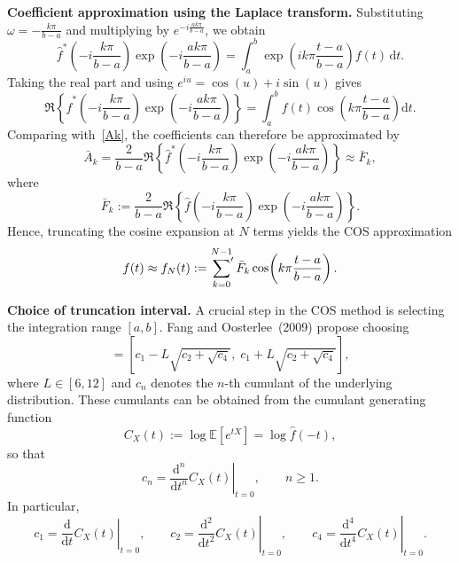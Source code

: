 \documentclass[11pt]{article}
\begin{document}
\noindent
\textbf{Coefficient approximation using the Laplace transform.}
Substituting $\omega=-\frac{k\pi}{b-a}$ and multiplying by $e^{-i\frac{ak\pi}{b-a}}$, we obtain
\begin{equation}
    \hat{f}^{*}\!\left(-i\frac{k\pi}{b-a}\right)
    \exp\!\left(-i\frac{ak\pi}{b-a}\right)
    =
    \int_{a}^{b}
    \exp\!\left(i k\pi\frac{t-a}{b-a}\right)
    f(t)\,\mathrm{d}t.
\end{equation}
Taking the real part and using $e^{iu}=\cos(u)+i\sin(u)$ gives
\begin{equation}\label{realpart}
    \Re\!\left\{
    \hat{f}^{*}\!\left(-i\frac{k\pi}{b-a}\right)
    \exp\!\left(-i\frac{ak\pi}{b-a}\right)
    \right\}
    =
    \int_{a}^{b}
    f(t)\cos\!\left(k\pi\frac{t-a}{b-a}\right)\mathrm{d}t.
\end{equation}
Comparing with~\eqref{Ak}, the coefficients can therefore be approximated by
\begin{equation}
    \bar{A}_k
    =
    \frac{2}{b-a}
    \Re\!\left\{
    \hat{f}^{*}\!\left(-i\frac{k\pi}{b-a}\right)
    \exp\!\left(-i\frac{ak\pi}{b-a}\right)
    \right\}
    \approx
    \bar{F}_k,
\end{equation}
where
\begin{equation}
    \bar{F}_k
    :=
    \frac{2}{b-a}
    \Re\!\left\{
    \hat{f}\!\left(-i\frac{k\pi}{b-a}\right)
    \exp\!\left(-i\frac{ak\pi}{b-a}\right)
    \right\}.
\end{equation}
Hence, truncating the cosine expansion at $N$ terms yields the COS approximation
\begin{equation}\label{COS_approx}
    f(t)
    \approx
    f_{N}(t)
    :=
    \sideset{}{'}\sum_{k=0}^{N-1}
    \bar{F}_k
    \cos\!\left(k\pi\frac{t-a}{b-a}\right).
\end{equation}

\medskip

\noindent
\textbf{Choice of truncation interval.}
A crucial step in the COS method is selecting the integration range $[a,b]$.
Fang and Oosterlee~(2009) propose choosing
\begin{equation}
    [a,b]
    =
    \left[
    c_1 - L\sqrt{c_2+\sqrt{c_4}},
    \;
    c_1 + L\sqrt{c_2+\sqrt{c_4}}
    \right],
\end{equation}
where $L\in[6,12]$ and $c_n$ denotes the $n$-th cumulant of the underlying distribution.
These cumulants can be obtained from the cumulant generating function
\begin{equation}
    C_X(t)
    :=
    \log\mathbb{E}[e^{tX}]
    =
    \log \hat{f}(-t),
\end{equation}
so that
\begin{equation}
    c_n
    =
    \left.
    \frac{\mathrm{d}^n}{\mathrm{d}t^n}C_X(t)
    \right|_{t=0},
    \qquad n\geq 1.
\end{equation}
In particular,
\begin{equation}
    c_1
    =
    \left.\frac{\mathrm{d}}{\mathrm{d}t}C_X(t)\right|_{t=0},
    \qquad
    c_2
    =
    \left.\frac{\mathrm{d}^2}{\mathrm{d}t^2}C_X(t)\right|_{t=0},
    \qquad
    c_4
    =
    \left.\frac{\mathrm{d}^4}{\mathrm{d}t^4}C_X(t)\right|_{t=0}.
\end{equation}
\end{document}
